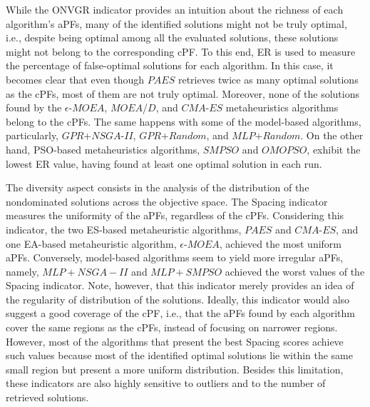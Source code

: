 While the \ac{ONVGR} indicator provides an intuition about the richness of each algorithm's \acp{aPF}, many of the identified solutions might not be truly optimal, i.e., despite being optimal among all the evaluated solutions, these solutions might not belong to the corresponding \ac{cPF}. To this end, \ac{ER} is used to measure the percentage of false-optimal solutions for each algorithm. In this case, it becomes clear that even though $PAES$ retrieves twice as many optimal solutions as the \acp{cPF}, most of them are not truly optimal. Moreover, none of the solutions found by the $\epsilon$-$MOEA$, $MOEA$/$D$, and $CMA$-$ES$ metaheuristics algorithms belong to the \acp{cPF}. The same happens with some of the model-based algorithms, particularly, $GPR$+$NSGA$-$II$, $GPR$+$Random$, and $MLP$+$Random$. On the other hand, \ac{PSO}-based metaheuristics algorithms, $SMPSO$ and $OMOPSO$, exhibit the lowest \ac{ER} value, having found at least one optimal solution in each run.

The diversity aspect consists in the analysis of the distribution of the nondominated solutions across the objective space. The Spacing indicator measures the uniformity of the \acp{aPF}, regardless of the \acp{cPF}. Considering this indicator, the two \ac{ES}-based metaheuristic algorithms, $PAES$ and $CMA$-$ES$, and one \ac{EA}-based metaheuristic algorithm, $\epsilon$-$MOEA$, achieved the most uniform \acp{aPF}. Conversely, model-based algorithms seem to yield more irregular \acp{aPF}, namely, $MLP+NSGA-II$ and $MLP+SMPSO$ achieved the worst values of the Spacing indicator. Note, however, that this indicator merely provides an idea of the regularity of distribution of the solutions. Ideally, this indicator would also suggest a good coverage of the \ac{cPF}, i.e., that the \acp{aPF} found by each algorithm cover the same regions as the \acp{cPF}, instead of focusing on narrower regions. However, most of the algorithms that present the best Spacing scores achieve such values because most of the identified optimal solutions lie within the same small region but present a more uniform distribution. Besides this limitation, these indicators are also highly sensitive to outliers and to the number of retrieved solutions. %

